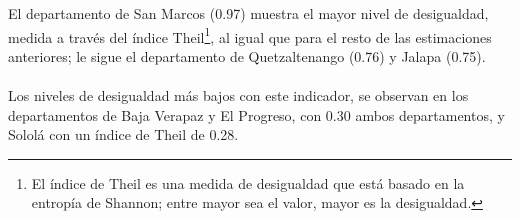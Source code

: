 El departamento de San Marcos (0.97) muestra el mayor nivel de desigualdad, medida a través del índice Theil\footnote{El índice de Theil es una medida de desigualdad que está basado en la entropía de Shannon; entre mayor sea el valor, mayor es la desigualdad.}, al igual que para el resto de las estimaciones anteriores;  le sigue el departamento de Quetzaltenango (0.76) y Jalapa (0.75). \\\\
 Los niveles de desigualdad más bajos  con este indicador, se observan en los departamentos de Baja Verapaz y El Progreso, con 0.30 ambos departamentos, y Sololá con un índice de Theil de 0.28.